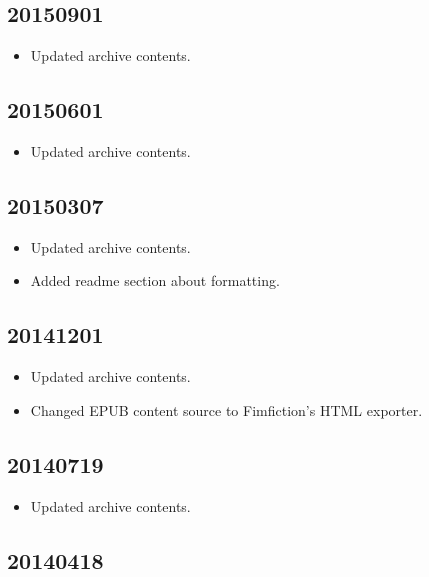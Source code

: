 \documentclass[hidelinks,a4paper,12pt]{article}
\begin{document}
\subsection{20150901}  \label{sec:changelog_20150901}

\begin{itemize}
\item Updated archive contents.
\end{itemize}

\subsection{20150601}  \label{sec:changelog_20150601}

\begin{itemize}
\item Updated archive contents.
\end{itemize}

\subsection{20150307}  \label{sec:changelog_20150307}

\begin{itemize}
\item Updated archive contents.
\item Added readme section about formatting.
\end{itemize}

\subsection{20141201} \label{sec:changelog_20141201}

\begin{itemize}
\item Updated archive contents.
\item Changed EPUB content source to Fimfiction's HTML exporter.
\end{itemize}

\subsection{20140719} \label{sec:changelog_20140719}

\begin{itemize}
\item Updated archive contents.
\end{itemize}

\subsection{20140418} \label{sec:changelog_20140418}
\end{document}

